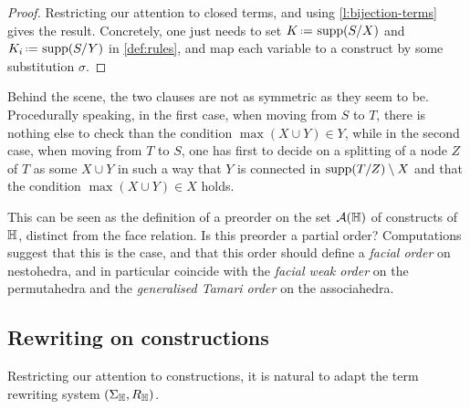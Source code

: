 \begin{proof}
  Restricting our attention to closed terms, and using \cref{l:bijection-terms} gives the result. 
  Concretely, one just needs to set $K\eqdef \supp(\occ{S}{X})$ and $K_i\eqdef \supp(\occ{S}{Y})$ in \cref{def:rules}, and map each variable to a construct by some substitution $\sigma$.
\end{proof}

Behind the scene, the two clauses are not as symmetric as they seem to be. 
Procedurally speaking, in the first case, when moving from $S$ to $T$, there is nothing else to check than the condition $\max(X\cup Y)\in Y$, while in the second case, when moving from $T$ to $S$, one has first to decide on a splitting of a node $Z$ of $T$ as some $X\cup Y$ in such a way that $Y$ is connected in $\operatorname{supp}(T/Z)\setminus X$ and  that  the condition $\max(X\cup Y)\in X$ holds.

\begin{rem}
  This can be seen as the definition of a preorder on the set $\mathcal{A}({\mathbb H})$ of constructs of ${\mathbb H}$, distinct from the face relation. 
  Is this preorder a partial order?
  Computations suggest that this is the case, and that this order should define a \emph{facial order} on nestohedra, and in particular coincide with the \emph{facial weak order} \cite{KrobLatapyNovelliPhanSchwer,PalaciosRonco,DermenjianHohlwegPilaud} on the permutahedra and the \emph{generalised Tamari order} \cite{Ronco-Tamari} on the associahedra.
\end{rem}


\subsection{Rewriting on constructions}
\label{ss:rewriting-constructions}

Restricting our attention to constructions, it is natural to adapt the term rewriting system  $(\Sigma_{\mathbb H},R_{\mathbb H})$.

